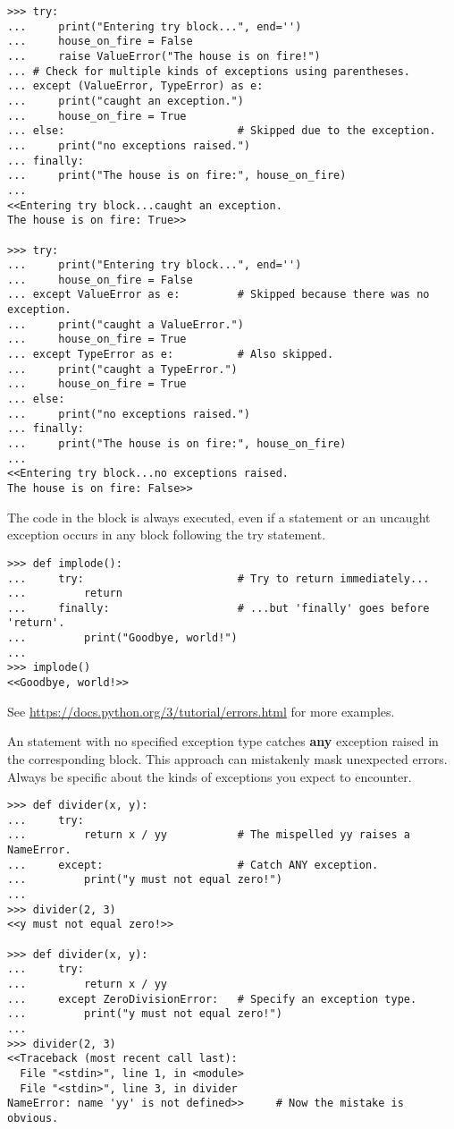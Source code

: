 \begin{lstlisting}
>>> try:
...     print("Entering try block...", end='')
...     house_on_fire = False
...     raise ValueError("The house is on fire!")
... # Check for multiple kinds of exceptions using parentheses.
... except (ValueError, TypeError) as e:
...     print("caught an exception.")
...     house_on_fire = True
... else:                           # Skipped due to the exception.
...     print("no exceptions raised.")
... finally:
...     print("The house is on fire:", house_on_fire)
...
<<Entering try block...caught an exception.
The house is on fire: True>>

>>> try:
...     print("Entering try block...", end='')
...     house_on_fire = False
... except ValueError as e:         # Skipped because there was no exception.
...     print("caught a ValueError.")
...     house_on_fire = True
... except TypeError as e:          # Also skipped.
...     print("caught a TypeError.")
...     house_on_fire = True
... else:
...     print("no exceptions raised.")
... finally:
...     print("The house is on fire:", house_on_fire)
...
<<Entering try block...no exceptions raised.
The house is on fire: False>>
\end{lstlisting}

The code in the  block is always executed, even if a  statement or an uncaught exception occurs in any block following the try statement.

\begin{lstlisting}
>>> def implode():
...     try:                        # Try to return immediately...
...         return
...     finally:                    # ...but 'finally' goes before 'return'.
...         print("Goodbye, world!")
...
>>> implode()
<<Goodbye, world!>>
\end{lstlisting}

See \url{https://docs.python.org/3/tutorial/errors.html} for more examples.

\begin{warn} %
An  statement with no specified exception type catches \textbf{any} exception raised in the corresponding  block.
This approach can mistakenly mask unexpected errors.
Always be specific about the kinds of exceptions you expect to encounter.

\begin{lstlisting}
>>> def divider(x, y):
...     try:
...         return x / yy           # The mispelled yy raises a NameError.
...     except:                     # Catch ANY exception.
...         print("y must not equal zero!")
...
>>> divider(2, 3)
<<y must not equal zero!>>

>>> def divider(x, y):
...     try:
...         return x / yy
...     except ZeroDivisionError:   # Specify an exception type.
...         print("y must not equal zero!")
...
>>> divider(2, 3)
<<Traceback (most recent call last):
  File "<stdin>", line 1, in <module>
  File "<stdin>", line 3, in divider
NameError: name 'yy' is not defined>>     # Now the mistake is obvious.
\end{lstlisting}
\end{warn}

